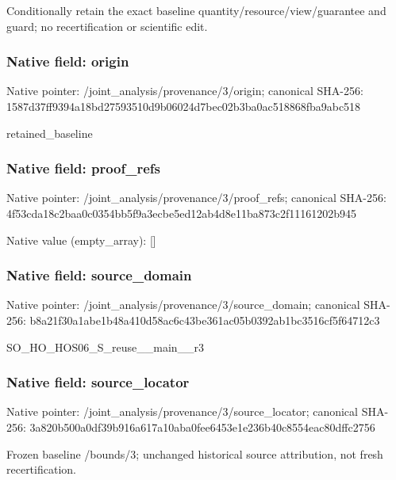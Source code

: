 \documentclass[10pt,a4paper]{article}
\begin{document}
\begingroup\raggedright\sloppy Conditionally retain the exact baseline quantity/\allowbreak{}resource/\allowbreak{}view/\allowbreak{}guarantee and guard;\allowbreak{} no recertification or scientific edit.\par\endgroup

\subsubsection{Native field: origin}
Native pointer: /joint\_\allowbreak{}analysis/provenance/3/origin; canonical SHA-256: 1587d37ff9394a18bd27593510d9b06024d7bec02b3ba0ac518868fba9abc518

\begingroup\raggedright\sloppy retained\_\allowbreak{}baseline\par\endgroup

\subsubsection{Native field: proof\_\allowbreak{}refs}
Native pointer: /joint\_\allowbreak{}analysis/provenance/3/proof\_\allowbreak{}refs; canonical SHA-256: 4f53cda18c2baa0c0354bb5f9a3ecbe5ed12ab4d8e11ba873c2f11161202b945

Native value (empty\_\allowbreak{}array): []

\subsubsection{Native field: source\_\allowbreak{}domain}
Native pointer: /joint\_\allowbreak{}analysis/provenance/3/source\_\allowbreak{}domain; canonical SHA-256: b8a21f30a1abe1b48a410d58ac6c43be361ac05b0392ab1bc3516cf5f64712c3

\begingroup\raggedright\sloppy SO\_\allowbreak{}HO\_\allowbreak{}HOS06\_\allowbreak{}S\_\allowbreak{}reuse\_\allowbreak{}\_\allowbreak{}main\_\allowbreak{}\_\allowbreak{}r3\par\endgroup

\subsubsection{Native field: source\_\allowbreak{}locator}
Native pointer: /joint\_\allowbreak{}analysis/provenance/3/source\_\allowbreak{}locator; canonical SHA-256: 3a820b500a0df39b916a617a10aba0fee6453e1e236b40c8554eac80dffc2756

\begingroup\raggedright\sloppy Frozen baseline /\allowbreak{}bounds/\allowbreak{}3;\allowbreak{} unchanged historical source attribution,\allowbreak{} not fresh recertification.\par\endgroup
\end{document}
